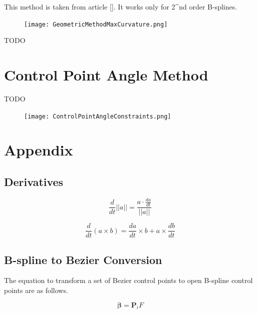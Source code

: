 \documentclass{article}
\begin{document}
This method is taken from article []. It works only for 2^{nd} order B-splines.

\begin{figure}[H]
\begin{center}
\texttt{[image: GeometricMethodMaxCurvature.png]}
\end{center}
\caption{}
\label{Fig:GeometricMethodMaxCurvature}
\end{figure}

TODO

\section{Control Point Angle Method}

TODO

\begin{figure}[H]
\begin{center}
\texttt{[image: ControlPointAngleConstraints.png]}
\end{center}
\caption{}
\label{Fig:ControlPointAngleConstraints}
\end{figure}

\section{Appendix}

\subsection{Derivatives}

\begin{equation}
    \frac{d}{dt} ||a|| = \frac{a \cdot \frac{da}{dt}}{||a||}
\end{equation}

\begin{equation}
    \frac{d}{dt} (a \times b) = \frac{da}{dt} \times b +  a \times \frac{db}{dt}
\end{equation}

\subsection{B-spline to Bezier Conversion}

The equation to transform a set of Bezier control points to open B-spline control points are as follows.

\begin{equation}
    \boldsymbol{\beta} = \textbf{P}_i F
\end{equation}
\end{document}
